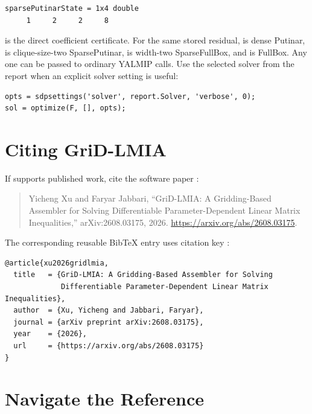 \begin{lstlisting}[style=dpoutput]
sparsePutinarState = 1x4 double
     1     2     2     8
\end{lstlisting}

 is the direct coefficient certificate. For the same stored residual,  is dense Putinar,  is clique-size-two SparsePutinar,  is width-two SparseFullBox, and  is FullBox. Any one can be passed to ordinary YALMIP calls. Use the selected solver from the report when an explicit solver setting is useful:

\begin{lstlisting}[style=dpsyntax]
opts = sdpsettings('solver', report.Solver, 'verbose', 0);
sol = optimize(F, [], opts);
\end{lstlisting}

\section{Citing GriD-LMIA}
\label{sec:citing-grid-lmia}

If \pkg{} supports published work, cite the software paper \cite{xu2026gridlmia}:

\begin{quote}
Yicheng Xu and Faryar Jabbari, ``GriD-LMIA: A Gridding-Based Assembler for Solving Differentiable Parameter-Dependent Linear Matrix Inequalities,'' arXiv:2608.03175, 2026. \href{https://arxiv.org/abs/2608.03175}{https://arxiv.org/abs/2608.03175}.
\end{quote}

The corresponding reusable BibTeX entry uses citation key :

\begin{lstlisting}[style=dpsyntax]
@article{xu2026gridlmia,
  title   = {GriD-LMIA: A Gridding-Based Assembler for Solving
             Differentiable Parameter-Dependent Linear Matrix Inequalities},
  author  = {Xu, Yicheng and Jabbari, Faryar},
  journal = {arXiv preprint arXiv:2608.03175},
  year    = {2026},
  url     = {https://arxiv.org/abs/2608.03175}
}
\end{lstlisting}

\section{Navigate the Reference}
\label{sec:global-lookup}


